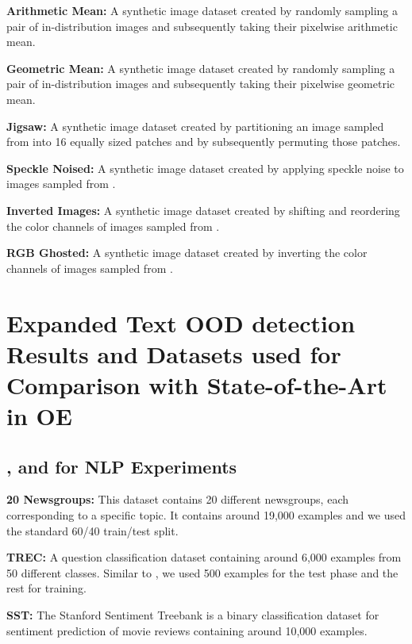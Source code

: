 \documentclass{article} \usepackage{iclr2020_conference,times}
\begin{document}
\textbf{Arithmetic Mean: }A synthetic image dataset created by randomly sampling a pair of in-distribution images and subsequently taking their pixelwise arithmetic mean.
\vspace{-5pt}

\textbf{Geometric Mean: }A synthetic image dataset created by randomly sampling a pair of in-distribution images and subsequently taking their pixelwise geometric mean.
\vspace{-5pt}

\textbf{Jigsaw: }A synthetic image dataset created by partitioning an image sampled from  into 16 equally sized patches and by subsequently permuting those patches.
\vspace{-5pt}

\textbf{Speckle Noised: }A synthetic image dataset created by applying speckle noise to images sampled from .
\vspace{-5pt}

\textbf{Inverted Images: }A synthetic image dataset created by shifting and reordering the color channels of images sampled from .
\vspace{-5pt}

\textbf{RGB Ghosted: }A synthetic image dataset created by inverting the color channels of images sampled from .


\section{Expanded Text OOD detection Results and Datasets used for Comparison with State-of-the-Art in OE}
\subsection{,  and  for NLP Experiments}\label{nlpdata}
\textbf{20 Newsgroups: }This dataset contains 20 different newsgroups, each corresponding to a specific topic. It contains around 19,000 examples and we used the standard 60/40 train/test split.
\vspace{-5pt}

\textbf{TREC: }A question classification dataset containing around 6,000 examples from 50 different classes. Similar to \citet{hendrycks2019oe}, we used 500 examples for the test phase and the rest for training.
\vspace{-5pt}

\textbf{SST: }The Stanford Sentiment Treebank \citep{brusilovsky:socher2013recursive} is a binary classification dataset for sentiment prediction of movie reviews containing around 10,000 examples.
\vspace{-5pt}
\end{document}

